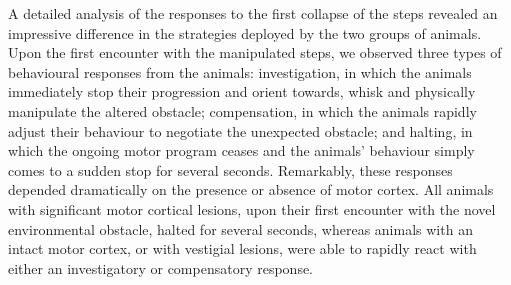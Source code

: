 A detailed analysis of the responses to the first collapse of the steps revealed an impressive difference in the strategies deployed by the two groups of animals. Upon the first encounter with the manipulated steps, we observed three types of behavioural responses from the animals: investigation, in which the animals immediately stop their progression and orient towards, whisk and physically manipulate the altered obstacle; compensation, in which the animals rapidly adjust their behaviour to negotiate the unexpected obstacle; and halting, in which the ongoing motor program ceases and the animals' behaviour simply comes to a sudden stop for several seconds. Remarkably, these responses depended dramatically on the presence or absence of motor cortex. All animals with significant motor cortical lesions, upon their first encounter with the novel environmental obstacle, halted for several seconds, whereas animals with an intact motor cortex, or with vestigial lesions, were able to rapidly react with either an investigatory or compensatory response.
